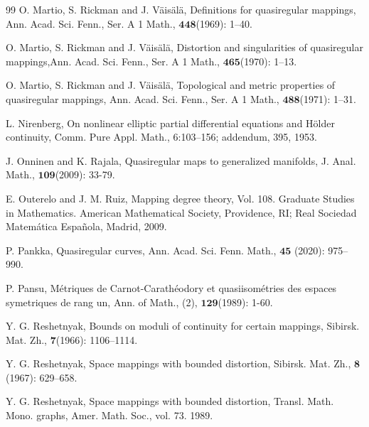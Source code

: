 \documentclass[11pt,twoside]{article}
\theoremstyle{definition}
\theoremstyle{remark}
\begin{document}
\begin{thebibliography}{99}
O. Martio, S. Rickman and J. V\"{a}is\"{a}l\"{a},  Definitions for quasiregular mappings, Ann. Acad. Sci. Fenn., Ser. A 1 Math., $\mathbf{448}$(1969): 1–40.


O. Martio, S. Rickman and J. V\"{a}is\"{a}l\"{a}, Distortion and singularities of quasiregular mappings,Ann. Acad. Sci. Fenn., Ser. A 1 Math., $\mathbf{465}$(1970): 1–13.



O. Martio, S. Rickman and J. V\"{a}is\"{a}l\"{a}, Topological and metric properties of quasiregular mappings, Ann. Acad. Sci. Fenn., Ser. A 1 Math., $\mathbf{488}$(1971): 1–31.


L. Nirenberg, On nonlinear elliptic partial differential equations and H\"{o}lder continuity, Comm. Pure Appl. Math., 6:103–156; addendum, 395, 1953.

 J. Onninen and K. Rajala, Quasiregular maps to generalized manifolds, J. Anal. Math.,  $\mathbf{109}$(2009): 33-79.


 E. Outerelo and J. M. Ruiz, Mapping degree theory, Vol. 108. Graduate Studies in Mathematics. American Mathematical Society, Providence, RI; Real Sociedad
 Matem\'{a}tica Espa\~{n}ola, Madrid, 2009.



P. Pankka, Quasiregular curves, Ann. Acad. Sci. Fenn. Math., $\mathbf{45}$ (2020): 975–990.












P. Pansu, M\'{e}triques de Carnot-Carath\'{e}odory et quasiisom\'{e}tries des espaces symetriques de rang un, Ann. of Math., (2),  $\mathbf{129}$(1989): 1-60.









Y. G. Reshetnyak, Bounds on moduli of continuity for certain mappings, Sibirsk. Mat. Zh., $\mathbf{7}$(1966): 1106–1114.

Y. G. Reshetnyak, Space mappings with bounded distortion, Sibirsk. Mat. Zh., $\mathbf{8}$(1967): 629–658.

Y. G. Reshetnyak, Space mappings with bounded distortion, Transl. Math. Mono. graphs, Amer. Math. Soc., vol. 73. 1989.





\end{thebibliography}
\end{document}
